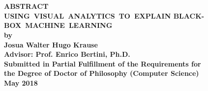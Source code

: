 \documentclass[12pt,draft,letterpaper]{report}
\newcommand{\thesistitle}{USING~VISUAL~ANALYTICS~TO~EXPLAIN
BLACK-BOX~MACHINE~LEARNING}
\newcommand{\thesisauthor}{Josua Walter Hugo Krause}
\newcommand{\thesisadvisor}{Enrico Bertini, Ph.D.}
\newcommand{\graddate}{May 2018} %
\begin{document}
\section*{}
\begin{center}
{\bfseries 
  \vspace{.25in}  
  {\bf ABSTRACT}\\
  \vspace{.25in}
  {\bf \thesistitle}\\  
  \vspace{.25in}
  {\bf by}\\  
  \vspace{.5in}
  {\bf \thesisauthor}\\
  \vspace{.5in}
  {\bf Advisor: Prof. \thesisadvisor}\\
  \vspace{.25in}
  {\bf Submitted in Partial Fulfillment of the Requirements for}\\
  {\bf the Degree of Doctor of Philosophy (Computer Science)}\\
  \vspace{.25in}
  {\bf \graddate}  
  \vspace{.25in}
}
\end{center}

\newpage

\tableofcontents

\listoffigures{}
\newpage

\listoftables{}
\newpage


%
\end{document}
